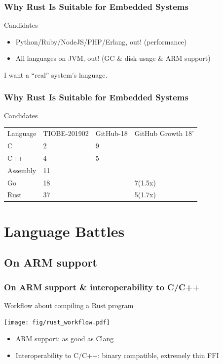 \documentclass[lualatex,utf8]{beamer}
\begin{document}
\begin{frame}
  \frametitle{Why Rust Is Suitable for Embedded Systems}
  \begin{exampleblock}{Candidates}
    \begin{itemize}
    \item Python/Ruby/NodeJS/PHP/Erlang, out! (performance)
    \item All languages on JVM, out! (GC \& disk usage \& ARM support)
    \end{itemize}
    I want a ``real'' system's language.
  \end{exampleblock}
\end{frame}

\begin{frame}
  \frametitle{Why Rust Is Suitable for Embedded Systems}
  \begin{block}{Candidates}
    \begin{tabu}{*4{X[c]}}
      Language & TIOBE-201902 & GitHub-18 & GitHub Growth 18' \\
      C & 2 & 9 & \\
      C++ & 4 & 5 & \\
      Assembly & 11 & & \\
      Go & 18 & & 7(1.5x)\\
      Rust & 37 & & 5(1.7x)\\
    \end{tabu}
  \end{block}
\end{frame}

\section{Language Battles}
\subsection{On ARM support}

\begin{frame}
  \frametitle{On ARM support \& interoperability to C/C++}
  \begin{block}{Workflow about compiling a Rust program}
    \begin{center}
      \texttt{[image: fig/rust\_workflow.pdf]}
    \end{center}
    \begin{itemize}
    \item ARM support: as good as Clang
    \item Interoperability to C/C++: binary compatible, extremely thin FFI
    \end{itemize}
  \end{block}
\end{frame}
\end{document}
